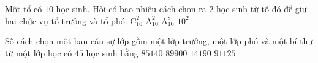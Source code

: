 \begin{ex}%
	Một tổ có $10$ học sinh. Hỏi có bao nhiêu cách chọn ra $2$ học sinh từ tổ đó để giữ hai chức vụ tổ trưởng và tổ phó.
	\choice
	{$\mathrm{C}_{10}^2$}
	{\True $\mathrm{A}_{10}^2$}
	{$\mathrm{A}_{10}^8$}
	{$10^2$}
\end{ex}

\begin{ex}%
	Số cách chọn một ban cán sự lớp gồm một lớp trưởng, một lớp phó và một bí thư từ một lớp học có $45$ học sinh bằng
	\choice
	{\True $85140$}
	{$89900$}
	{$14190$}
	{$91125$}
\end{ex}

